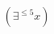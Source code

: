 \documentclass[preview]{standalone}
\begin{document}
\begin{align*}
(\exists^{\le 5} x)
\end{align*}
\end{document}
